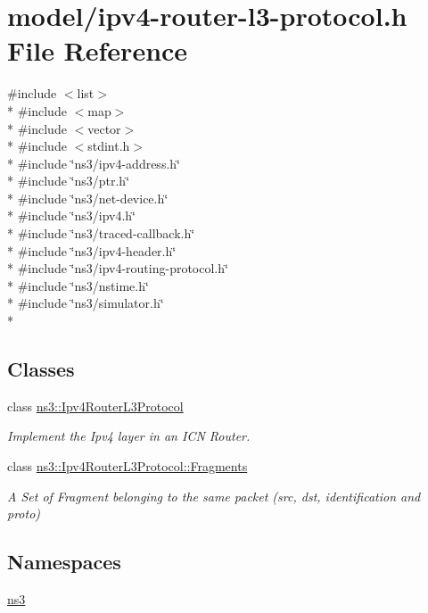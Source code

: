 \hypertarget{ipv4-router-l3-protocol_8h}{\section{model/ipv4-\/router-\/l3-\/protocol.h File Reference}
\label{ipv4-router-l3-protocol_8h}
}
{\ttfamily \#include $<$list$>$}\\*
{\ttfamily \#include $<$map$>$}\\*
{\ttfamily \#include $<$vector$>$}\\*
{\ttfamily \#include $<$stdint.\-h$>$}\\*
{\ttfamily \#include \char`\"{}ns3/ipv4-\/address.\-h\char`\"{}}\\*
{\ttfamily \#include \char`\"{}ns3/ptr.\-h\char`\"{}}\\*
{\ttfamily \#include \char`\"{}ns3/net-\/device.\-h\char`\"{}}\\*
{\ttfamily \#include \char`\"{}ns3/ipv4.\-h\char`\"{}}\\*
{\ttfamily \#include \char`\"{}ns3/traced-\/callback.\-h\char`\"{}}\\*
{\ttfamily \#include \char`\"{}ns3/ipv4-\/header.\-h\char`\"{}}\\*
{\ttfamily \#include \char`\"{}ns3/ipv4-\/routing-\/protocol.\-h\char`\"{}}\\*
{\ttfamily \#include \char`\"{}ns3/nstime.\-h\char`\"{}}\\*
{\ttfamily \#include \char`\"{}ns3/simulator.\-h\char`\"{}}\\*
\subsection*{Classes}
\begin{DoxyCompactItemize}
\item 
class \hyperlink{classns3_1_1Ipv4RouterL3Protocol}{ns3\-::\-Ipv4\-Router\-L3\-Protocol}
\begin{DoxyCompactList}\small\item\em Implement the Ipv4 layer in an I\-C\-N Router. \end{DoxyCompactList}\item 
class \hyperlink{classns3_1_1Ipv4RouterL3Protocol_1_1Fragments}{ns3\-::\-Ipv4\-Router\-L3\-Protocol\-::\-Fragments}
\begin{DoxyCompactList}\small\item\em A Set of Fragment belonging to the same packet (src, dst, identification and proto) \end{DoxyCompactList}\end{DoxyCompactItemize}
\subsection*{Namespaces}
\begin{DoxyCompactItemize}
\item 
\hyperlink{namespacens3}{ns3}
\end{DoxyCompactItemize}

